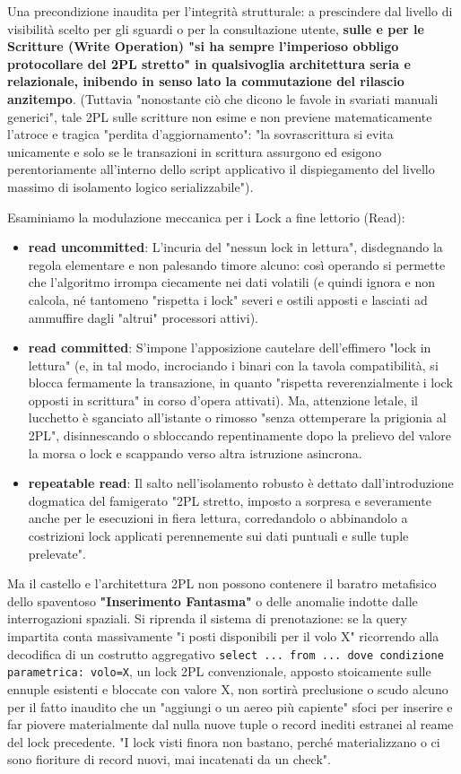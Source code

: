 Una precondizione inaudita per l'integrità strutturale: a prescindere dal livello di visibilità scelto per gli sguardi o per la consultazione utente, \textbf{sulle e per le Scritture (Write Operation) "si ha sempre l'imperioso obbligo protocollare del 2PL stretto" in qualsivoglia architettura seria e relazionale, inibendo in senso lato la commutazione del rilascio anzitempo}. (Tuttavia "nonostante ciò che dicono le favole in svariati manuali generici", tale 2PL sulle scritture non esime e non previene matematicamente l'atroce e tragica "perdita d'aggiornamento": "la sovrascrittura si evita unicamente e solo se le transazioni in scrittura assurgono ed esigono perentoriamente all'interno dello script applicativo il dispiegamento del livello massimo di isolamento logico serializzabile").

Esaminiamo la modulazione meccanica per i Lock a fine lettorio (Read):
\begin{itemize}
    \item \textbf{read uncommitted}: L'incuria del "nessun lock in lettura", disdegnando la regola elementare e non palesando timore alcuno: così operando si permette che l'algoritmo irrompa ciecamente nei dati volatili (e quindi ignora e non calcola, né tantomeno "rispetta i lock" severi e ostili apposti e lasciati ad ammuffire dagli "altrui" processori attivi).
    \item \textbf{read committed}: S'impone l'apposizione cautelare dell'effimero "lock in lettura" (e, in tal modo, incrociando i binari con la tavola compatibilità, si blocca fermamente la transazione, in quanto "rispetta reverenzialmente i lock opposti in scrittura" in corso d'opera attivati). Ma, attenzione letale, il lucchetto è sganciato all'istante o rimosso "senza ottemperare la prigionia al 2PL", disinnescando o sbloccando repentinamente dopo la prelievo del valore la morsa o lock e scappando verso altra istruzione asincrona.
    \item \textbf{repeatable read}: Il salto nell'isolamento robusto è dettato dall'introduzione dogmatica del famigerato "2PL stretto, imposto a sorpresa e severamente anche per le esecuzioni in fiera lettura, corredandolo o abbinandolo a costrizioni lock applicati perennemente sui dati puntuali e sulle tuple prelevate".
\end{itemize}

Ma il castello e l'architettura 2PL non possono contenere il baratro metafisico dello spaventoso \textbf{"Inserimento Fantasma"} o delle anomalie indotte dalle interrogazioni spaziali.
Si riprenda il sistema di prenotazione: se la query impartita conta massivamente "i posti disponibili per il volo X" ricorrendo alla decodifica di un costrutto aggregativo \texttt{select ... from ... dove condizione parametrica: volo=X}, un lock 2PL convenzionale, apposto stoicamente sulle ennuple esistenti e bloccate con valore X, non sortirà preclusione o scudo alcuno per il fatto inaudito che un "aggiungi o un aereo più capiente" sfoci per inserire e far piovere materialmente dal nulla nuove tuple o record inediti estranei al reame del lock precedente. "I lock visti finora non bastano, perché materializzano o ci sono fioriture di record nuovi, mai incatenati da un check".

